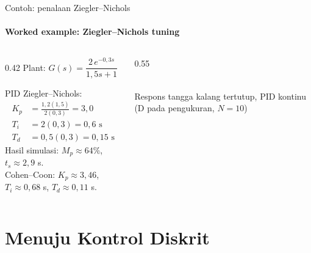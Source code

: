 \documentclass[aspectratio=169,10pt]{beamer}
\begin{document}
\begin{frame}{Contoh: penalaan Ziegler--Nichols}
	\framesubtitle{Worked example: Ziegler--Nichols tuning}
	\begin{columns}[c]
		\begin{column}{0.42\textwidth}
			\small
			Plant: $G(s) = \dfrac{2\,e^{-0{,}3s}}{1{,}5s + 1}$

			\vspace{0.2cm}
			PID Ziegler--Nichols:
			\begin{align*}
				K_p &= \frac{1{,}2(1{,}5)}{2(0{,}3)} = 3{,}0 \\
				T_i &= 2(0{,}3) = 0{,}6 \text{ s} \\
				T_d &= 0{,}5(0{,}3) = 0{,}15 \text{ s}
			\end{align*}
			Hasil simulasi: $M_p \approx 64\%$, $t_s \approx 2{,}9$ s.\\[3pt]
			{\scriptsize Cohen--Coon: $K_p \approx 3{,}46$, $T_i \approx 0{,}68$ s, $T_d \approx 0{,}11$ s.}
		\end{column}
		\begin{column}{0.55\textwidth}
			\centering
			\\
			{\scriptsize Respons tangga kalang tertutup, PID kontinu (D pada pengukuran, $N=10$)}
		\end{column}
	\end{columns}
\end{frame}

\section{Menuju Kontrol Diskrit\texorpdfstring{\\[4pt]{\Large{}}}{ / Towards Discrete Control}}
\end{document}
